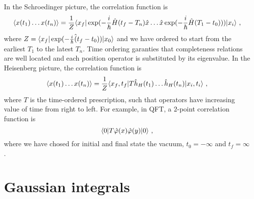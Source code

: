     In the Schroedinger picture, the correlation function is 
    \begin{equation*}
        \langle x(t_1) \ldots x(t_n)\rangle = \frac{1}{Z} \langle x_f\vert \exp(- \frac{i}{\hbar} \hat H (t_f - T_n) \hat x \ldots \hat x \exp(- \frac{i}{\hbar} \hat H (T_1 - t_0))) \vert x_i\rangle ~,
    \end{equation*}
    where $Z = \langle x_f\vert \exp(- \frac{i}{\hbar} \hat (t_f - t_0)) \vert x_0\rangle$ and we have ordered to start from the earliest $T_1$ to the latest $T_n$. Time ordering garanties that completeness relations are well located and each position operator is substituted by its eigenvalue. In the Heisenberg picture, the correlation function is 
    \begin{equation*}
        \langle x(t_1) \ldots x(t_n)\rangle = \frac{1}{Z} \langle x_f, t_f\vert T \hat h_H (t_1) \ldots \hat h_H (t_n) \vert x_i, t_i\rangle ~,
    \end{equation*}
    where $T$ is the time-ordered prescription, such that operators have increasing value of time from right to left. For example, in QFT, a $2$-point correlation function is 
    \begin{equation*}
        \langle0\vert T \hat \varphi (x) \hat \varphi (y) \vert0\rangle ~,
    \end{equation*}
    where we have chosed for initial and final state the vacuum, $t_0 = - \infty$ and $t_f = \infty$.

\section{Gaussian integrals}

